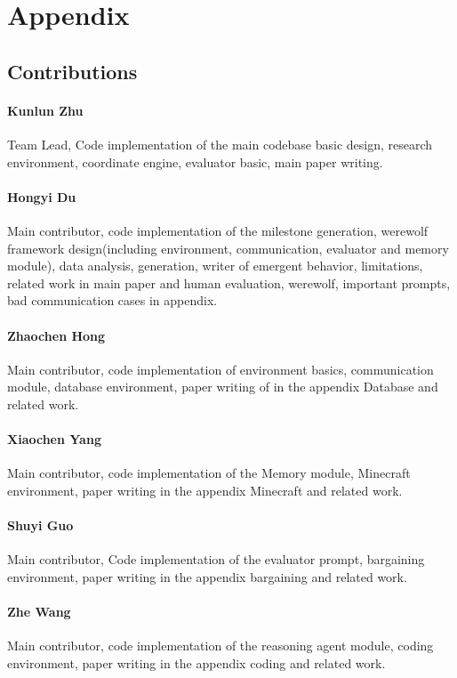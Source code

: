 
\appendix

\section{Appendix}

\subsection{Contributions}
\label{app_contrib}
\paragraph{Kunlun Zhu} 
Team Lead, Code implementation of the main codebase basic design, research environment, coordinate engine, evaluator basic, main paper writing.

\paragraph{Hongyi Du}
Main contributor, code implementation of the milestone generation, werewolf framework design(including environment, communication, evaluator and memory module), data analysis, generation, writer of emergent behavior, limitations, related work in main paper and human evaluation, werewolf, important prompts, bad communication cases in appendix.

\paragraph{Zhaochen Hong}
Main contributor, code implementation of environment basics, communication module, database environment, paper writing of in the appendix Database and related work.

\paragraph{Xiaochen Yang}
Main contributor, code implementation of the Memory module, Minecraft environment, paper writing in the appendix Minecraft and related work.


\paragraph{Shuyi Guo}
Main contributor, Code implementation of the evaluator prompt, bargaining environment, paper writing in the appendix bargaining and related work.


\paragraph{Zhe Wang}
Main contributor, code implementation of the reasoning agent module, coding environment, paper writing in the appendix coding and related work.


